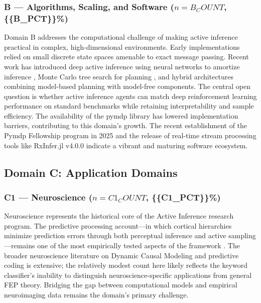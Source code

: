 \documentclass[
]{article}
\begin{document}
\subsubsection{\texorpdfstring{B --- Algorithms, Scaling, and Software
(\(n = {{B_COUNT}}\),
\{\{B\_PCT\}\}\%)}{B --- Algorithms, Scaling, and Software (n = \{\{B\_COUNT\}\}, \{\{B\_PCT\}\}\%)}}\label{b-algorithms-scaling-and-software-n-b_count-b_pct}

Domain B addresses the computational challenge of making active
inference practical in complex, high-dimensional environments. Early
implementations relied on small discrete state spaces amenable to exact
message passing. Recent work has introduced deep active inference using
neural networks to amortize inference \citep{fountas2020deep}, Monte
Carlo tree search for planning \citep{champion2021realizing}, and hybrid
architectures combining model-based planning with model-free components.
The central open question is whether active inference agents can match
deep reinforcement learning performance on standard benchmarks while
retaining interpretability and sample efficiency. The availability of
the pymdp library \citep{heins2022pymdp} has lowered implementation
barriers, contributing to this domain's growth. The recent establishment
of the Pymdp Fellowship program in 2025 and the release of real-time
stream processing tools like RxInfer.jl v4.0.0 \citep{rxinfer2025}
indicate a vibrant and maturing software ecosystem.

\subsection{Domain C: Application
Domains}\label{domain-c-application-domains}

\subsubsection{\texorpdfstring{C1 --- Neuroscience
(\(n = {{C1_COUNT}}\),
\{\{C1\_PCT\}\}\%)}{C1 --- Neuroscience (n = \{\{C1\_COUNT\}\}, \{\{C1\_PCT\}\}\%)}}\label{c1-neuroscience-n-c1_count-c1_pct}

Neuroscience represents the historical core of the Active Inference
research program. The predictive processing account---in which cortical
hierarchies minimize prediction errors through both perceptual inference
and active sampling---remains one of the most empirically tested aspects
of the framework \citep{friston2010free, clark2013whatever}. The broader
neuroscience literature on Dynamic Causal Modeling and predictive coding
is extensive; the relatively modest count here likely reflects the
keyword classifier's inability to distinguish neuroscience-specific
applications from general FEP theory. Bridging the gap between
computational models and empirical neuroimaging data remains the
domain's primary challenge.
\end{document}
